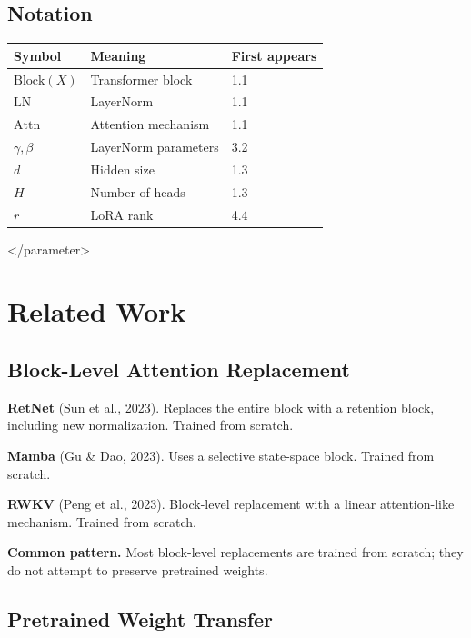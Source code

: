 \subsection{Notation}

\begin{table}[H]
\centering
\small
\begin{tabular}{lll}
\toprule
\textbf{Symbol} & \textbf{Meaning} & \textbf{First appears} \\
\midrule
$\text{Block}(X)$ & Transformer block & 1.1 \\
$\text{LN}$ & LayerNorm & 1.1 \\
$\text{Attn}$ & Attention mechanism & 1.1 \\
$\gamma, \beta$ & LayerNorm parameters & 3.2 \\
$d$ & Hidden size & 1.3 \\
$H$ & Number of heads & 1.3 \\
$r$ & LoRA rank & 4.4 \\
\bottomrule
\end{tabular}
\end{table}
\textless{}/parameter\textgreater{}




\section{Related Work}

\subsection{Block-Level Attention Replacement}

\textbf{RetNet} (Sun et al., 2023). Replaces the entire block with a retention 
block, including new normalization. Trained from scratch.

\textbf{Mamba} (Gu \& Dao, 2023). Uses a selective state-space block. Trained from 
scratch.

\textbf{RWKV} (Peng et al., 2023). Block-level replacement with a linear 
attention-like mechanism. Trained from scratch.

\textbf{Common pattern.} Most block-level replacements are trained from scratch; 
they do not attempt to preserve pretrained weights.

\subsection{Pretrained Weight Transfer}

